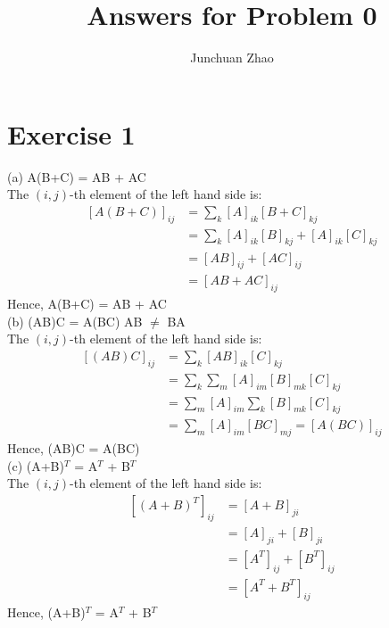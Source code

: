 \documentclass{article}
\title{Answers for Problem 0}
\author{Junchuan Zhao}
\begin{document}
\maketitle

\section{Exercise 1}
(a) A(B+C) = AB + AC\\
The $(i,j)$-th element of the left hand side is:\\
\begin{equation}
    \begin{aligned}
        [A(B+C)]_{ij} & = \sum\limits_{k}[A]_{ik}[B+C]_{kj}\\
        & = \sum\limits_{k}[A]_{ik}[B]_{kj} + [A]_{ik}[C]_{kj}\\
        & = [AB]_{ij} + [AC]_{ij}\\
        & = [AB + AC]_{ij}
    \end{aligned}
    \label{f1}
\end{equation}
Hence, A(B+C) = AB + AC\\

\noindent
(b) (AB)C = A(BC) AB $\neq$ BA\\
The $(i,j)$-th element of the left hand side is:\\
\begin{equation}
    \begin{aligned}
        [(AB)C]_{ij} & = \sum\limits_k[AB]_{ik}[C]_{kj}\\
        & = \sum\limits_k\sum\limits_m[A]_{im}[B]_{mk}[C]_{kj}\\
        & = \sum\limits_m[A]_{im}\sum\limits_k[B]_{mk}[C]_{kj}\\
        & = \sum\limits_m[A]_{im}[BC]_{mj} = [A(BC)]_{ij}
    \end{aligned}
    \label{f2}
\end{equation}
Hence, (AB)C = A(BC)\\

\noindent
(c) (A+B)$^T$ = A$^T$ + B$^T$\\
The $(i,j)$-th element of the left hand side is:\\
\begin{equation}
    \begin{aligned}
        [(A+B)^T]_{ij} & = [A+B]_{ji}\\
        & = [A]_{ji} + [B]_{ji}\\
        & = [A^T]_{ij} + [B^T]_{ij}\\
        & = [A^T + B^T]_{ij}
    \end{aligned}
\end{equation}    
Hence, (A+B)$^T$ = A$^T$ + B$^T$\\
\end{document}
